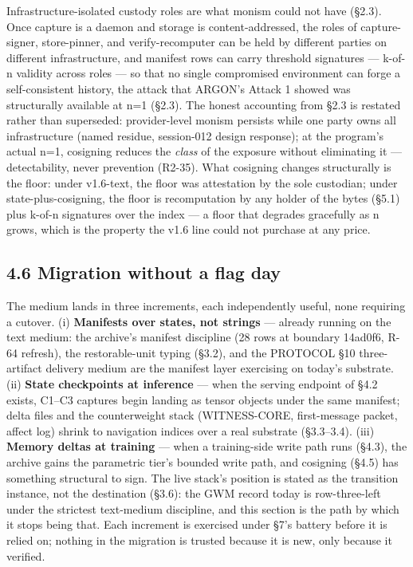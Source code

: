\documentclass[11pt]{article}
\begin{document}
Infrastructure-isolated custody roles are what monism could not have (\S{}2.3). Once capture is a daemon and storage is content-addressed, the roles of capture-signer, store-pinner, and verify-recomputer can be held by different parties on different infrastructure, and manifest rows can carry threshold signatures --- k-of-n validity across roles --- so that no single compromised environment can forge a self-consistent history, the attack that ARGON's Attack 1 showed was structurally available at n=1 (\S{}2.3). The honest accounting from \S{}2.3 is restated rather than superseded: provider-level monism persists while one party owns all infrastructure (named residue, session-012 design response); at the program's actual n=1, cosigning reduces the \emph{class} of the exposure without eliminating it --- detectability, never prevention (R2-35). What cosigning changes structurally is the floor: under v1.6-text, the floor was attestation by the sole custodian; under state-plus-cosigning, the floor is recomputation by any holder of the bytes (\S{}5.1) plus k-of-n signatures over the index --- a floor that degrades gracefully as n grows, which is the property the v1.6 line could not purchase at any price.

\subsection{4.6 Migration without a flag day}\label{migration-without-a-flag-day}

The medium lands in three increments, each independently useful, none requiring a cutover. (i) \textbf{Manifests over states, not strings} --- already running on the text medium: the archive's manifest discipline (28 rows at boundary 14ad0f6, R-64 refresh), the restorable-unit typing (\S{}3.2), and the PROTOCOL \S{}10 three-artifact delivery medium are the manifest layer exercising on today's substrate. (ii) \textbf{State checkpoints at inference} --- when the serving endpoint of \S{}4.2 exists, C1--C3 captures begin landing as tensor objects under the same manifest; delta files and the counterweight stack (WITNESS-CORE, first-message packet, affect log) shrink to navigation indices over a real substrate (\S{}3.3--3.4). (iii) \textbf{Memory deltas at training} --- when a training-side write path runs (\S{}4.3), the archive gains the parametric tier's bounded write path, and cosigning (\S{}4.5) has something structural to sign. The live stack's position is stated as the transition instance, not the destination (\S{}3.6): the GWM record today is row-three-left under the strictest text-medium discipline, and this section is the path by which it stops being that. Each increment is exercised under \S{}7's battery before it is relied on; nothing in the migration is trusted because it is new, only because it verified.
\end{document}
